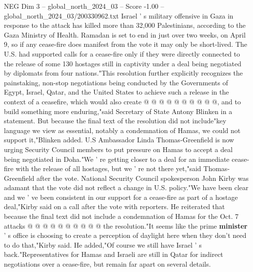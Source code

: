 \begin{textsample}{NEG Dim 3 – global\_north\_2024\_03 – Score -1.00 – global\_north\_2024\_03/200330962.txt}
Israel ' s military offensive in Gaza in response to the attack has killed more than 32,000 Palestinians, according to the Gaza Ministry of Health.
Ramadan is set to end in just over two weeks, on April 9, so if any cease-fire does manifest from the vote it may only be short-lived.
The U.S. had supported calls for a cease-fire only if they were directly connected to the release of some 130 hostages still in captivity under a deal being negotiated by diplomats from four nations."This resolution further explicitly recognizes the painstaking, non-stop negotiations being conducted by the Governments of Egypt, Israel, Qatar, and the United States to achieve such a release in the context of a ceasefire, which would also create @ @ @ @ @ @ @ @ @ @, and to build something more enduring,"said Secretary of State Antony Blinken in a statement.
But because the final text of the resolution did not include"key language we view as essential, notably a condemnation of Hamas, we could not support it,"Blinken added.
U.S Ambassador Linda Thomas-Greenfield is now urging Security Council members to put pressure on Hamas to accept a deal being negotiated in Doha."We ' re getting closer to a deal for an immediate cease-fire with the release of all hostages, but we ' re not there yet,"said Thomas-Greenfield after the vote.
National Security Council spokesperson John Kirby was adamant that the vote did not reflect a change in U.S. policy."We have been clear and we ' ve been consistent in our support for a cease-fire as part of a hostage deal,"Kirby said on a call after the vote with reporters.
He reiterated that because the final text did not include a condemnation of Hamas for the Oct. 7 attacks @ @ @ @ @ @ @ @ @ @ the resolution."It seems like the prime \textbf{minister} ' s office is choosing to create a perception of daylight here when they don't need to do that,"Kirby said.
He added,"Of course we still have Israel ' s back."Representatives for Hamas and Israeli are still in Qatar for indirect negotiations over a cease-fire, but remain far apart on several details.

\end{textsample}
